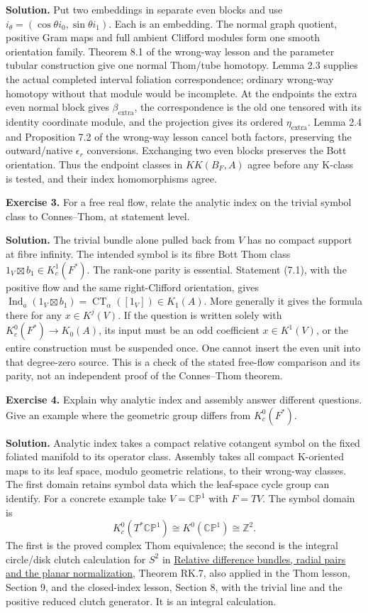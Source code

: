 \documentclass[
  11pt,
]{article}
\begin{document}
\textbf{Solution.} Put two embeddings in separate even blocks and use
\(i_\theta=(\cos\theta i_0,\sin\theta i_1)\). Each is an embedding. The
normal graph quotient, positive Gram maps and full ambient Clifford
modules form one smooth orientation family. Theorem 8.1 of the wrong-way
lesson and the parameter tubular construction give one normal Thom/tube
homotopy. Lemma 2.3 supplies the actual completed interval foliation
correspondence; ordinary wrong-way homotopy without that module would be
incomplete. At the endpoints the extra even normal block gives
\(\beta_{\mathrm{extra}}\), the correspondence is the old one tensored
with its identity coordinate module, and the projection gives its
ordered \(\eta_{\mathrm{extra}}\). Lemma 2.4 and Proposition 7.2 of the
wrong-way lesson cancel both factors, preserving the outward/native
\(\epsilon_r\) conversions. Exchanging two even blocks preserves the
Bott orientation. Thus the endpoint classes in \(KK(B_F,A)\) agree
before any K-class is tested, and their index homomorphisms agree.

\textbf{Exercise 3.} For a free real flow, relate the analytic index on
the trivial symbol class to Connes--Thom, at statement level.

\textbf{Solution.} The trivial bundle alone pulled back from \(V\) has
no compact support at fibre infinity. The intended symbol is its fibre
Bott Thom class \(1_V\boxtimes b_1\in K_c^1(F^*)\). The rank-one parity
is essential. Statement (7.1), with the positive flow and the same
right-Clifford orientation, gives
\(\operatorname{Ind}_a(1_V\boxtimes b_1)=\operatorname{CT}_\alpha([1_V])\in K_1(A)\).
More generally it gives the formula there for any \(x\in K^j(V)\). If
the question is written solely with \(K_c^0(F^*)\to K_0(A)\), its input
must be an odd coefficient \(x\in K^1(V)\), or the entire construction
must be suspended once. One cannot insert the even unit into that
degree-zero source. This is a check of the stated free-flow comparison
and its parity, not an independent proof of the Connes--Thom theorem.

\textbf{Exercise 4.} Explain why analytic index and assembly answer
different questions. Give an example where the geometric group differs
from \(K_c^0(F^*)\).

\textbf{Solution.} Analytic index takes a compact relative cotangent
symbol on the fixed foliated manifold to its operator class. Assembly
takes all compact K-oriented maps to its leaf space, modulo geometric
relations, to their wrong-way classes. The first domain retains symbol
data which the leaf-space cycle group can identify. For a concrete
example take \(V=\mathbb{CP}^1\) with \(F=TV\). The symbol domain is \[
 K_c^0(T^*\mathbb{CP}^1)\cong K^0(\mathbb{CP}^1)\cong\mathbb Z^2.
 \tag{8.1}
\] The first is the proved complex Thom equivalence; the second is the
integral circle/disk clutch calculation for \(S^2\) in
\href{supporting/relative-k-foundations/relative-k-foundations.html\#rk-sphere-ring}{Relative
difference bundles, radial pairs and the planar normalization}, Theorem
RK.7, also applied in the Thom lesson, Section 9, and the closed-index
lesson, Section 8, with the trivial line and the positive reduced clutch
generator. It is an integral calculation.
\end{document}
